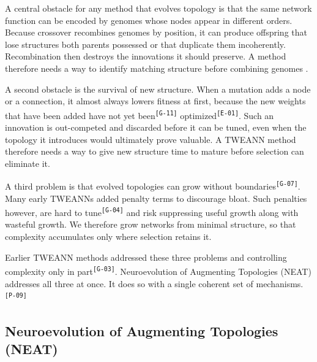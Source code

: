 \documentclass[12pt]{article}
\newcommand{\revID}[1]{\textsuperscript{\scriptsize\texttt{[#1]}}}
\newcommand{\revGram}[2]{\textcolor{lrRed}{#2}\revID{#1}}       %
\newcommand{\revPlain}[2]{\textcolor{lrGreen}{#2}\revID{#1}}    %
\newcommand{\revBrit}[2]{\textcolor{lrBlue}{#2}\revID{#1}}      %
\begin{document}
A central obstacle for any method that evolves topology is that the same network function can be encoded by genomes whose nodes appear in different orders.
Because crossover recombines genomes by position, it can produce offspring that lose structures both parents possessed or that duplicate them incoherently.
Recombination then destroys the innovations it should preserve.
A method therefore needs a way to identify matching structure before combining genomes \parencite{stanley_evolving_2002}.

A second obstacle is the survival of new structure.
When a mutation adds a node or a connection, it almost always lowers fitness at first, because \revGram{G-11}{the new weights that have been added have not yet been} \revBrit{E-01}{optimized}.
Such an innovation is out-competed and discarded before it can be tuned, even when the topology it introduces would ultimately prove valuable.
A TWEANN method therefore needs a way to give new structure time to mature before selection can eliminate it.

A third problem is that \revGram{G-07}{evolved topologies can grow without boundaries}.
Many early TWEANNs added penalty terms to discourage bloat.
\revGram{G-04}{Such penalties however, are hard to tune} and risk suppressing useful growth along with wasteful growth.
We therefore grow networks from minimal structure, so that complexity accumulates only where selection retains it.

Earlier TWEANN methods \revGram{G-03}{addressed these three problems and controlling complexity only in part}.
Neuroevolution of Augmenting Topologies (NEAT) \parencite{stanley_evolving_2002} addresses all three at once.
\revPlain{P-09}{It does so with a single coherent set of mechanisms.}


\subsection{Neuroevolution of Augmenting Topologies (NEAT)}
\label{subsec:neuroevolution-of-augmenting-topologies-neat}
\end{document}
